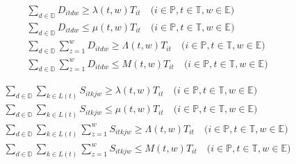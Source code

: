 \documentclass{article}
\begin{document}
\begin{gather}
\sum_{d \in \mathbb{D}}D_{itdw} \geq \lambda(t,w)T_{it} \quad \text{($i \in \mathbb{P},t \in \mathbb{T},w \in \mathbb{E}$)} \label{eqn:TT_T_weeklylb} \\
\sum_{d \in \mathbb{D}}D_{itdw} \leq \mu(t,w)T_{it} \quad \text{($i \in \mathbb{P},t \in \mathbb{T},w \in \mathbb{E}$)} \label{eqn:TT_T_weeklyub} \\
%
\sum_{d \in \mathbb{D}} \sum_{z=1}^{w} D_{itdw} \geq \Lambda (t,w)T_{it} \quad \text{($i \in \mathbb{P},t \in \mathbb{T},w \in \mathbb{E}$)} \label{eqn:TT_T_cum_weeklylb} \\
\sum_{d \in \mathbb{D}} \sum_{z=1}^{w} D_{itdw} \leq M(t,w)T_{it} \quad \text{($i \in \mathbb{P},t \in \mathbb{T},w \in \mathbb{E}$)} \label{eqn:TT_T_cum_weeklyub} 
%
\end{gather} 

\begin{gather}
\sum_{d \in \mathbb{D}}\sum_{k \in L(t)}S_{itkjw} \geq \lambda(t,w)T_{it} \quad \text{($i \in \mathbb{P},t \in \mathbb{T},w \in \mathbb{E}$)} \label{eqn:S_T_weeklylb} \\
\sum_{d \in \mathbb{D}}\sum_{k \in L(t)}S_{itkjw} \leq \mu(t,w)T_{it} \quad \text{($i \in \mathbb{P},t \in \mathbb{T},w \in \mathbb{E}$)} \label{eqn:S_T_weeklyub} \\
%
\sum_{d \in \mathbb{D}} \sum_{k \in L(t)} \sum_{z=1}^{w} S_{itkjw} \geq \Lambda (t,w)T_{it} \quad \text{($i \in \mathbb{P},t \in \mathbb{T},w \in \mathbb{E}$)} \label{eqn:S_T_cum_weeklylb} \\
\sum_{d \in \mathbb{D}} \sum_{k \in L(t)} \sum_{z=1}^{w} S_{itkjw} \leq M(t,w)T_{it} \quad \text{($i \in \mathbb{P},t \in \mathbb{T},w \in \mathbb{E}$)} \label{eqn:S_T_cum_weeklyub} 
%
\end{gather} 
\end{document}
